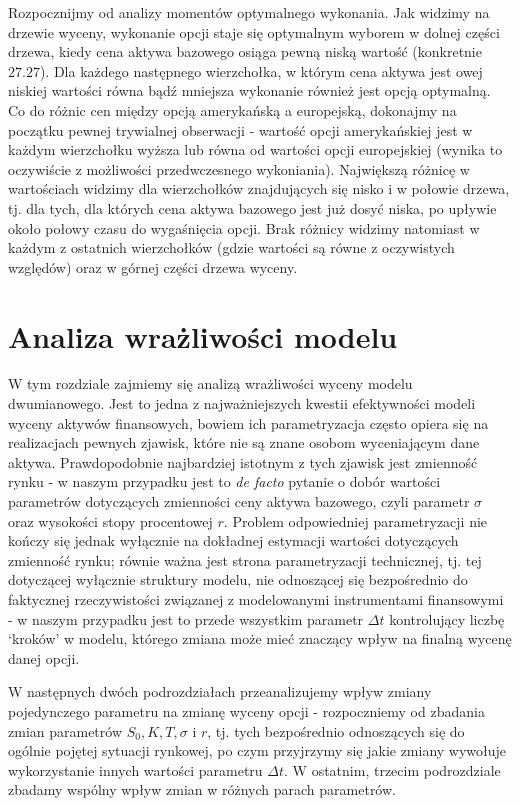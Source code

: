 \documentclass[
]{article}
\begin{document}
Rozpocznijmy od analizy momentów optymalnego wykonania. Jak widzimy na
drzewie wyceny, wykonanie opcji staje się optymalnym wyborem w dolnej
części drzewa, kiedy cena aktywa bazowego osiąga pewną niską wartość
(konkretnie \(27.27\)). Dla każdego następnego wierzchołka, w którym
cena aktywa jest owej niskiej wartości równa bądź mniejsza wykonanie
również jest opcją optymalną. Co do różnic cen między opcją amerykańską
a europejską, dokonajmy na początku pewnej trywialnej obserwacji -
wartość opcji amerykańskiej jest w każdym wierzchołku wyższa lub równa
od wartości opcji europejskiej (wynika to oczywiście z możliwości
przedwczesnego wykoniania). Największą różnicę w wartościach widzimy dla
wierzchołków znajdujących się nisko i w połowie drzewa, tj. dla tych,
dla których cena aktywa bazowego jest już dosyć niska, po upływie około
połowy czasu do wygaśnięcia opcji. Brak różnicy widzimy natomiast w
każdym z ostatnich wierzchołków (gdzie wartości są równe z oczywistych
względów) oraz w górnej części drzewa wyceny.

\hypertarget{analiza-wraux17cliwoux15bci-modelu}{%
\section{Analiza wrażliwości
modelu}\label{analiza-wraux17cliwoux15bci-modelu}}

W tym rozdziale zajmiemy się analizą wrażliwości wyceny modelu
dwumianowego. Jest to jedna z najważniejszych kwestii efektywności
modeli wyceny aktywów finansowych, bowiem ich parametryzacja często
opiera się na realizacjach pewnych zjawisk, które nie są znane osobom
wyceniającym dane aktywa. Prawdopodobnie najbardziej istotnym z tych
zjawisk jest zmienność rynku - w naszym przypadku jest to \emph{de
facto} pytanie o dobór wartości parametrów dotyczących zmienności ceny
aktywa bazowego, czyli parametr \(\sigma\) oraz wysokości stopy
procentowej \(r\). Problem odpowiedniej parametryzacji nie kończy się
jednak wyłącznie na dokładnej estymacji wartości dotyczących zmienność
rynku; równie ważna jest strona parametryzacji technicznej, tj. tej
dotyczącej wyłącznie struktury modelu, nie odnoszącej się bezpośrednio
do faktycznej rzeczywistości związanej z modelowanymi instrumentami
finansowymi - w naszym przypadku jest to przede wszystkim parametr
\(\Delta t\) kontrolujący liczbę `kroków' w modelu, którego zmiana może
mieć znaczący wpływ na finalną wycenę danej opcji.

W następnych dwóch podrozdziałach przeanalizujemy wpływ zmiany
pojedynczego parametru na zmianę wyceny opcji - rozpoczniemy od zbadania
zmian parametrów \(S_0, K, T, \sigma\) i \(r\), tj. tych bezpośrednio
odnoszących się do ogólnie pojętej sytuacji rynkowej, po czym przyjrzymy
się jakie zmiany wywołuje wykorzystanie innych wartości parametru
\(\Delta t\). W ostatnim, trzecim podrozdziale zbadamy wspólny wpływ
zmian w różnych parach parametrów.
\end{document}
